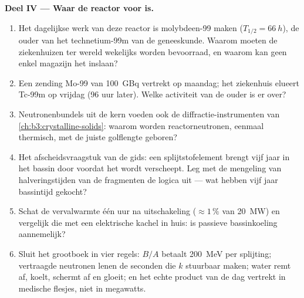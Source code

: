 \begin{problem}
\medskip\noindent\textbf{Deel IV --- Waar de reactor voor is.}

\begin{enumerate}[resume]
  \item Het dagelijkse werk van deze reactor is molybdeen-99 maken
        ($T_{1/2} = \qty{66}{h}$), de ouder van het
        technetium-99m van de geneeskunde. Waarom moeten de ziekenhuizen ter wereld
        wekelijks worden bevoorraad, en waarom kan geen enkel magazijn het inslaan?
  \item Een zending Mo-99 van \qty{100}{GBq} vertrekt op maandag; het
        ziekenhuis elueert Tc-99m op vrijdag (96 uur later). Welke
        activiteit van de ouder is er over?
  \item Neutronenbundels uit de kern voeden ook de diffractie-instrumenten
        van \cref{ch:b3:crystalline-solids}: waarom worden reactorneutronen,
        eenmaal thermisch, met de juiste golflengte geboren?
  \item Het afscheidsvraagstuk van de gids: een splijtstofelement brengt vijf
        jaar in het bassin door voordat het wordt verscheept. Leg met de
        mengeling van halveringstijden van de fragmenten de logica uit --- wat hebben vijf
        jaar bassintijd gekocht?
  \item Schat de vervalwarmte één uur na uitschakeling
        ($\approx1\,\%$ van \qty{20}{MW}) en vergelijk die met een
        elektrische kachel in huis: is passieve bassinkoeling
        aannemelijk?
  \item Sluit het grootboek in vier regels: $B/A$ betaalt
        \qty{200}{MeV} per splijting; vertraagde neutronen lenen de
        seconden die $k$ stuurbaar maken; water remt af,
        koelt, schermt af en gloeit; en het echte product van de dag
        vertrekt in medische flesjes, niet in megawatts.
\end{enumerate}
\end{problem}
